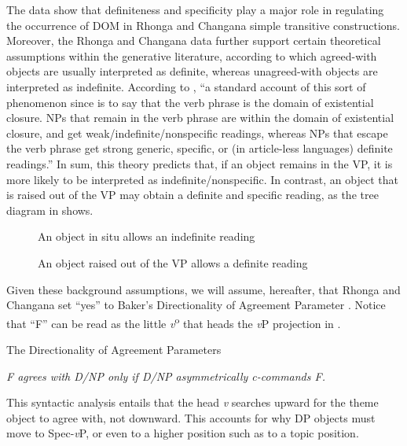 \documentclass[output=paper]{langsci/langscibook}
\begin{document}
The data show that definiteness and specificity play a major role in regulating the occurrence of DOM in Rhonga and Changana simple transitive constructions. Moreover, the Rhonga and Changana data further support certain theoretical assumptions within the generative literature, according to which agreed-with objects are usually interpreted as definite, whereas unagreed-with objects are interpreted as indefinite. According to \citet[199]{Baker2008}, “a standard account of this sort of phenomenon since \citet{Diesing1992} is to say that the verb phrase is the domain of existential closure. NPs that remain in the verb phrase are within the domain of existential closure, and get weak/indefinite/nonspecific readings, whereas NPs that escape the verb phrase get strong generic, specific, or (in article-less languages) definite readings.” In sum, this theory predicts that, if an object remains in the VP, it is more likely to be interpreted as indefinite/nonspecific. In contrast, an object that is raised out of the VP may obtain a definite and specific reading, as the tree diagram in  shows.


\begin{figure}
\caption{An object in situ allows an indefinite reading}
 \label{fig:1}
\end{figure}

  
\begin{figure}
 

\caption{An object raised out of the VP allows a definite reading}
\label{fig:2}
\end{figure}

Given these background assumptions, we will assume, hereafter, that Rhonga and Changana set “yes” to Baker’s Directionality of Agreement Parameter . Notice that “F” can be read as the little \textit{v}\textsuperscript{o} that heads the {\textit{v}}P projection in .

{The Directionality of Agreement Parameters \citep[155]{Baker2008}}

{\textit{F agrees with D/NP only if D/NP asymmetrically c-commands F.}}

This syntactic analysis entails that the head {\textit{v}} searches upward for the theme object to agree with, not downward. This accounts for why DP objects must move to Spec-{\textit{v}}P, or even to a higher position such as to a topic position.
\end{document}
